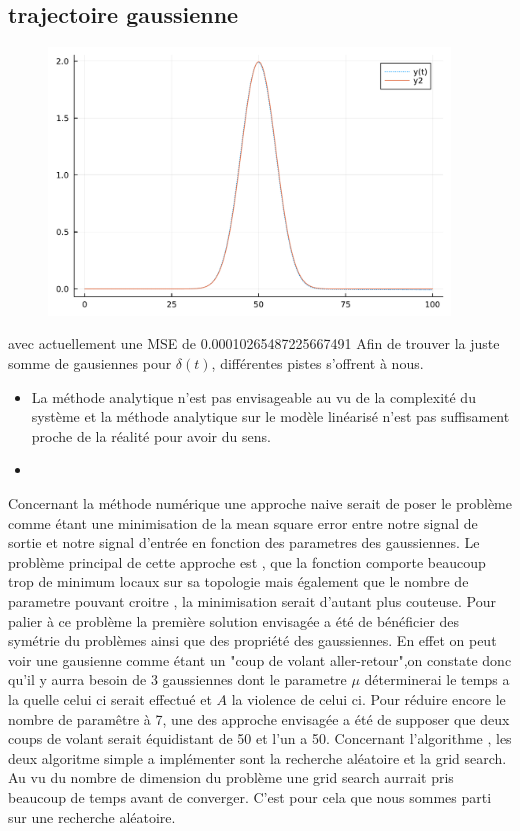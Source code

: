 \documentclass[11pt,a4paper]{article}
\begin{document}
\subsection{trajectoire gaussienne}
\begin{figure}[!h]
  \begin{center}
    \includegraphics[width=0.95\textwidth]{../code/jlplots/Q1_8.pdf}
  \end{center}
  \caption{}\label{fig:Q1_8_gaussian}
\end{figure}

avec actuellement une MSE de 0.00010265487225667491
Afin de trouver la juste somme de gausiennes pour $\delta(t)$, différentes pistes s'offrent à nous.
\begin{itemize}
  \item 
La méthode analytique n'est pas envisageable au vu de la complexité du système et la méthode analytique sur le modèle linéarisé n'est pas suffisament proche de la réalité pour avoir du sens. 
\item 
\end{itemize}
Concernant la méthode numérique une approche naive serait de poser le problème comme étant une minimisation de la mean square error entre notre signal de sortie et notre signal d'entrée en fonction des parametres des gaussiennes. 
Le problème principal de cette approche est , que la fonction comporte beaucoup trop de minimum locaux sur sa topologie mais également que le nombre de parametre pouvant croitre , la minimisation serait d'autant plus couteuse. 
Pour palier à ce problème la première solution envisagée a été de bénéficier des symétrie du problèmes ainsi que des propriété des gaussiennes.
En effet on peut voir une gausienne comme étant un "coup de volant aller-retour",on constate donc qu'il y aurra besoin de 3 gaussiennes dont le parametre $\mu$ déterminerai le temps a la quelle celui ci serait effectué et $A$ la violence de celui ci. 
Pour réduire encore le nombre de paramêtre à 7, une des approche envisagée a été de supposer que deux coups de volant serait équidistant de 50 et l'un a 50. Concernant l'algorithme , les deux algoritme simple a implémenter sont la recherche aléatoire et la grid search. Au vu du nombre de dimension du problème une grid search aurrait pris beaucoup de temps avant de converger. C'est pour cela que nous sommes parti sur une recherche aléatoire. 
\end{document}
